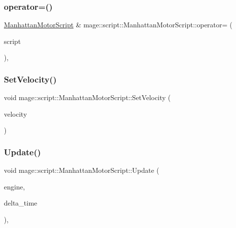 \subsubsection{\texorpdfstring{operator=()}{operator=()}\hspace{0.1cm}{\footnotesize\ttfamily [2/2]}}
{\footnotesize\ttfamily \hyperlink{classmage_1_1script_1_1_manhattan_motor_script}{Manhattan\+Motor\+Script} \& mage\+::script\+::\+Manhattan\+Motor\+Script\+::operator= (\begin{DoxyParamCaption}\item[{\hyperlink{classmage_1_1script_1_1_manhattan_motor_script}{Manhattan\+Motor\+Script} \&\&}]{script }\end{DoxyParamCaption})\hspace{0.3cm}{\ttfamily [default]}, {\ttfamily [noexcept]}}

\hypertarget{classmage_1_1script_1_1_manhattan_motor_script_acf4db52ae6b0c9f97c0b7e719acea6bc}{}\label{classmage_1_1script_1_1_manhattan_motor_script_acf4db52ae6b0c9f97c0b7e719acea6bc} 
\subsubsection{\texorpdfstring{Set\+Velocity()}{SetVelocity()}}
{\footnotesize\ttfamily void mage\+::script\+::\+Manhattan\+Motor\+Script\+::\+Set\+Velocity (\begin{DoxyParamCaption}\item[{\hyperlink{namespacemage_aa97e833b45f06d60a0a9c4fc22ae02c0}{F32}}]{velocity }\end{DoxyParamCaption})\hspace{0.3cm}{\ttfamily [noexcept]}}

\hypertarget{classmage_1_1script_1_1_manhattan_motor_script_a217112de68b2dd1ad4fb9cbebb0537f0}{}\label{classmage_1_1script_1_1_manhattan_motor_script_a217112de68b2dd1ad4fb9cbebb0537f0} 
\subsubsection{\texorpdfstring{Update()}{Update()}}
{\footnotesize\ttfamily void mage\+::script\+::\+Manhattan\+Motor\+Script\+::\+Update (\begin{DoxyParamCaption}\item[{\mbox{[}\mbox{[}maybe\+\_\+unused\mbox{]} \mbox{]} \hyperlink{classmage_1_1_engine}{Engine} \&}]{engine,  }\item[{\mbox{[}\mbox{[}maybe\+\_\+unused\mbox{]} \mbox{]} \hyperlink{namespacemage_ad26233bbec640deda836e572c1a23708}{F64}}]{delta\+\_\+time }\end{DoxyParamCaption})\hspace{0.3cm}{\ttfamily [override]}, {\ttfamily [virtual]}}

